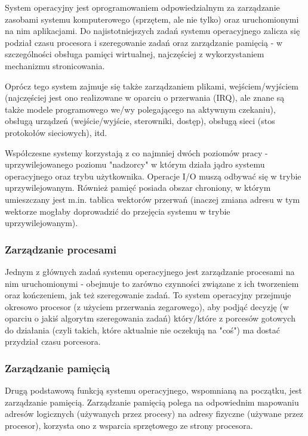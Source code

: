 System operacyjny jest oprogramowaniem odpowiedzialnym za zarządzanie zasobami systemu komputerowego (sprzętem, ale nie tylko) oraz uruchomionymi na nim aplikacjami. Do najistotniejszych zadań systemu operacyjnego zalicza się podział czasu procesora i szeregowanie zadań oraz zarządzanie pamięcią - w szczególności obsługa pamięci wirtualnej, najczęściej z wykorzystaniem mechanizmu stronicowania.

Oprócz tego system zajmuje się także zarządzaniem plikami, wejściem/wyjściem (najczęściej jest ono realizowane w oparciu o przerwania (IRQ), ale znane są także modele programowego we/wy polegającego na aktywnym czekaniu), obsługą urządzeń (wejście/wyjście, sterowniki, dostęp), obsługą sieci (stos protokołów sieciowych), itd.

Współczesne systemy korzystają z co najmniej dwóch poziomów pracy - uprzywilejowanego poziomu "nadzorcy" w którym działa jądro systemu operacyjnego oraz trybu użytkownika. Operacje I/O muszą odbywać się w trybie uprzywilejowanym. Również pamięć posiada obszar chroniony, w którym umieszczany jest m.in. tablica wektorów przerwań (inaczej zmiana adresu w tym wektorze mogłaby doprowadzić do przejęcia systemu w trybie uprzywilejowanym).

\subsubsection{Zarządzanie procesami}

Jednym z głównych zadań systemu operacyjnego jest zarządzanie procesami na nim uruchomionymi - obejmuje to zarówno czynności związane z ich tworzeniem oraz kończeniem, jak też szeregowanie zadań. To system operacyjny przejmuje okresowo procesor (z użyciem przerwania zegarowego), aby podjąć decyzję (w oparciu o jakiś algorytm szeregowania zadań) który/które z porcesów gotowych do działania (czyli takich, które aktualnie nie oczekują na "coś") ma dostać przydział czasu porcesora.

\subsubsection{Zarządzanie pamięcią}

Drugą podstawową funkcją systemu operacyjnego, wspomnianą na początku, jest zarządzanie pamięcią. Zarządzanie pamięcią polega na odpowiednim mapowaniu adresów logicznych (używanych przez procesy) na adresy fizyczne (używane przez procesor), korzysta ono z wsparcia sprzętowego ze strony procesora.

